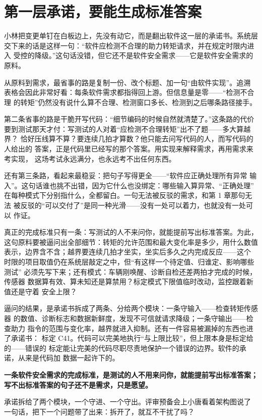 \section{第一层承诺，要能生成标准答案}

小林把变更单钉在白板边上，先没有动它，而是翻出软件这一层的承诺书。系统层
交下来的话是这样一句：“软件应检测不合理的助力转矩请求，并在规定时限内进入
受控的降级。”这句话没错，但它还不是软件安全需求——它是软件安全需求的原料。

从原料到需求，最省事的路是复制一份、改个标题、加一句“由软件实现”。追溯
表格会因此非常好看：每条软件需求都指得回上游。但信息量是零——“检测不合理
的转矩”仍然没有说什么算不合理、检测窗口多长、检测到之后哪条路径接手。

第二条省事的路是干脆开写代码：“细节编码的时候自然就清楚了。”这条路的代价
要到测试那天才付：写测试的人对着“应检测不合理转矩”出不了题——多大算越界？
恰好压线算不算？要连续几拍才算数？他只能去问写代码的人，而写代码的人给出的
答案，正是代码里已经写的那个答案。用实现来解释需求，再用需求来考实现，
这场考试永远满分，也永远考不出任何东西。

还有第三条路，看起来最稳妥：把句子写得更全——“软件应正确处理所有异常
输入”。这句话谁也挑不出错，因为它什么也没绑定：哪些输入算异常、“正确处理”
在每种模式下分别指什么，全都留白。一句无法被反驳的需求，和第 1 章那句无法
被反驳的“可以交付了”是同一种光滑——没有一处可以着力，也就没有一处可以
作证。

真正的完成标准只有一条：写测试的人不来问你，就能提前写出标准答案。为此，
这句原料要被逼问出全部细节：转矩的允许范围和最大变化率是多少，用什么数值
表示，边界含不含；越界要连续几拍才坐实，坐实后多久之内完成反应——这个
时限的项目取值仍在系统层敲定之中，但“有这样一个待定值、归谁定、影响哪些测试”
必须先写下来；还有模式：车辆刚唤醒、诊断自检还差两拍才完成的时候，传感器
数据算有效、算未知还是算禁用？标定模式下限值临时改动，监控跟着新值还是守着
安全上限？

逼问的结果，是承诺书拆成了两条、分给两个模块：一条守输入——检查转矩传感器
的数值、诊断标志和数据新鲜度，发现不可信就请求降级；一条守输出——检查助力
指令的范围与变化率，越界就进入抑制。还有一件容易被漏掉的东西也进了承诺书：
标定 C41。代码可以完美地执行“与上限比较”，但上限本身是标定给的——错误的
标定能让完美的代码尽职尽责地保护一个错误的边界。软件的承诺，从来是代码加
数据一起许下的。

\textbf{一条软件安全需求的完成标准，是测试的人不用来问你，就能提前写出标准答案；写不出标准答案的句子还不是需求，只是愿望。}

承诺拆给了两个模块，一个守进、一个守出。评审预备会上小唐看着架构图说了
一句话，把下一个问题带了出来：拆开了，就互不干扰了吗？

